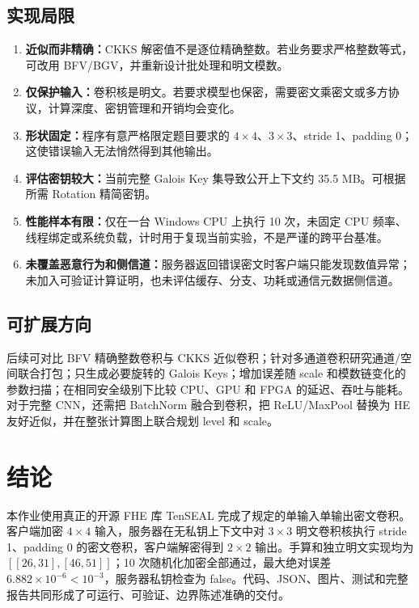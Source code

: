 \documentclass[UTF8,a4paper,zihao=-4]{ctexart}
\begin{document}
\subsection{实现局限}

\begin{enumerate}
  \item \textbf{近似而非精确：}CKKS 解密值不是逐位精确整数。若业务要求严格整数等式，可改用 BFV/BGV，并重新设计批处理和明文模数。
  \item \textbf{仅保护输入：}卷积核是明文。若要求模型也保密，需要密文乘密文或多方协议，计算深度、密钥管理和开销均会变化。
  \item \textbf{形状固定：}程序有意严格限定题目要求的 $4\times4$、$3\times3$、stride 1、padding 0；这使错误输入无法悄然得到其他输出。
  \item \textbf{评估密钥较大：}当前完整 Galois Key 集导致公开上下文约 35.5 MB。可根据所需 Rotation 精简密钥。
  \item \textbf{性能样本有限：}仅在一台 Windows CPU 上执行 10 次，未固定 CPU 频率、线程绑定或系统负载，计时用于复现当前实验，不是严谨的跨平台基准。
  \item \textbf{未覆盖恶意行为和侧信道：}服务器返回错误密文时客户端只能发现数值异常；未加入可验证计算证明，也未评估缓存、分支、功耗或通信元数据侧信道。
\end{enumerate}

\subsection{可扩展方向}

后续可对比 BFV 精确整数卷积与 CKKS 近似卷积；针对多通道卷积研究通道/空间联合打包；只生成必要旋转的 Galois Keys；增加误差随 scale 和模数链变化的参数扫描；在相同安全级别下比较 CPU、GPU 和 FPGA 的延迟、吞吐与能耗。对于完整 CNN，还需把 BatchNorm 融合到卷积，把 ReLU/MaxPool 替换为 HE 友好近似，并在整张计算图上联合规划 level 和 scale。

\section{结论}

本作业使用真正的开源 FHE 库 TenSEAL 完成了规定的单输入单输出密文卷积。客户端加密 $4\times4$ 输入，服务器在无私钥上下文中对 $3\times3$ 明文卷积核执行 stride 1、padding 0 的密文卷积，客户端解密得到 $2\times2$ 输出。手算和独立明文实现均为 $[[26,31],[46,51]]$；10 次随机化加密全部通过，最大绝对误差 $6.882\times10^{-6}<10^{-3}$，服务器私钥检查为 false。代码、JSON、图片、测试和完整报告共同形成了可运行、可验证、边界陈述准确的交付。
\end{document}
